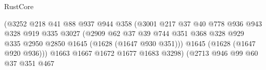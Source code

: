 \begin{lexlean}{RustCore}
\begin{coremodule}
                                              (@3252
                                                @218
                                                @41
                                                @88
                                                @937
                                                @944
                                                @358
                                                (@3001
                                                  @217
                                                  @37
                                                  @40
                                                  @778
                                                  @936
                                                  @943
                                                  @328
                                                  @919
                                                  @335
                                                  @3027
                                                  (@2909
                                                    @62
                                                    @37
                                                    @39
                                                    @744
                                                    @351
                                                    @368
                                                    @328
                                                    @929
                                                    @335
                                                    @2950
                                                    @2850
                                                    @1645
                                                    (@1628 (@1647 @930 @351)))
                                                  @1645
                                                  (@1628 (@1647 @920 @936)))
                                                @1663
                                                @1667
                                                @1672
                                                @1677
                                                @1683
                                                @3298)
                                              (@2713
                                                @946
                                                @99
                                                @60
                                                @37
                                                @351
                                                @467

\end{coremodule}
\end{lexlean}
